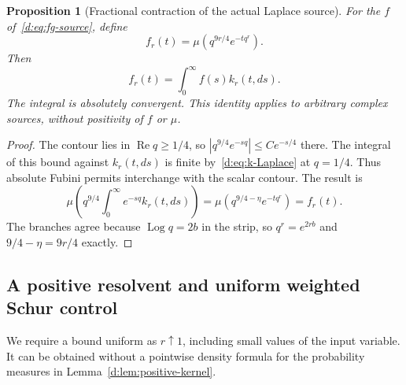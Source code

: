 \documentclass[11pt,a4paper]{article}
\numberwithin{equation}{section}
\newtheorem{proposition}[theorem]{Proposition}
\theoremstyle{definition}\newtheorem{definition}[theorem]{Definition}
\theoremstyle{remark}\newtheorem{remark}[theorem]{Remark}
\begin{document}
\begin{proposition}[Fractional contraction of the actual Laplace source]\label{d:prop:fractional-source}
For the $f$ of~\eqref{d:eq:fg-source}, define
\begin{equation}\label{d:eq:fr-definition}
 f_r(t)=\mu(q^{9r/4}e^{-tq^r}).
\end{equation}
Then
\begin{equation}\label{d:eq:fr-kernel}
 f_r(t)=\int_0^\infty f(s)k_r(t,ds).
\end{equation}
The integral is absolutely convergent. This identity applies to arbitrary complex sources, without positivity of $f$ or $\mu$.
\end{proposition}
\begin{proof}
The contour lies in $\operatorname{Re}q\ge1/4$, so
$|q^{9/4}e^{-sq}|\le C e^{-s/4}$ there. The integral of this bound against $k_r(t,ds)$ is finite by~\eqref{d:eq:k-Laplace} at $q=1/4$. Thus absolute Fubini permits interchange with the scalar contour. The result is
\[
 \mu\left(q^{9/4}\int_0^\infty e^{-sq}k_r(t,ds)\right)
 =\mu(q^{9/4-\eta}e^{-tq^r})=f_r(t).
\]
The branches agree because $\operatorname{Log}q=2b$ in the strip, so $q^r=e^{2rb}$ and $9/4-\eta=9r/4$ exactly.
\end{proof}

\subsection{A positive resolvent and uniform weighted Schur control}\label{d:sec:weighted-Schur}

We require a bound uniform as $r\uparrow1$, including small values of the input variable. It can be obtained without a pointwise density formula for the probability measures in Lemma~\ref{d:lem:positive-kernel}.
\end{document}
